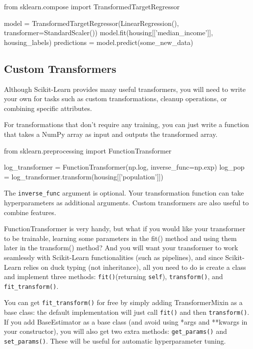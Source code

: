 \begin{pyc}
from sklearn.compose import TransformedTargetRegressor

model = TransformedTargetRegressor(LinearRegression(),
                                    transformer=StandardScaler())
model.fit(housing[['median_income']], housing_labels)
predictions = model.predict(some_new_data)
\end{pyc}
\subsection{Custom Transformers}
Although Scikit-Learn provides many useful transformers, you will need to write
your own for tasks such as custom transformations, cleanup operations, or combining specific attributes.

For transformations that don't require any training, you can just write a function
that takes a NumPy array as input and outputs the transformed array.

\begin{pyc}
from sklearn.preprocessing import FunctionTransformer

log_transformer = FunctionTransformer(np.log, inverse_func=np.exp)
log_pop = log_transformer.transform(housing[['population']])
\end{pyc}

The \verb|inverse_func| argument is optional. Your transformation function can take hyperparameters as additional arguments. Custom transformers are also useful to combine features.

FunctionTransformer is very handy, but what if you would like your transformer to
be trainable, learning some parameters in the fit() method and using them later
in the transform() method? And you will want your transformer to work seamlessly with Scikit-Learn functionalities (such as pipelines), and since Scikit-Learn relies on duck typing (not inheritance), all you need to do is create a class and implement three methods: \verb|fit()|(returning \verb|self|), \verb|transform()|, and \verb|fit_transform()|.

You can get \verb|fit_transform()| for free by simply adding TransformerMixin as a base
class: the default implementation will just call \verb|fit()| and then \verb|transform()|. If you add BaseEstimator as a base class (and avoid using *args and **kwargs in your
constructor), you will also get two extra methods: \verb|get_params()| and \verb|set_params()|. These will be useful for automatic hyperparameter tuning.

